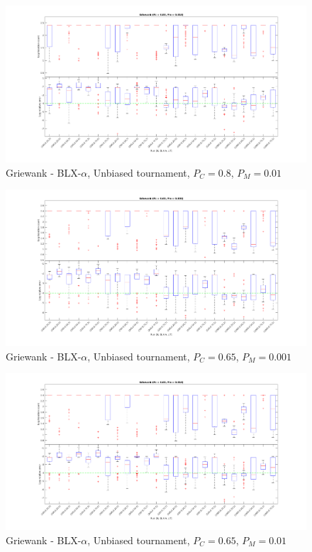 \documentclass[12pt, letterpaper]{article}
\begin{document}
\begin{figure}
  \includegraphics[width=\linewidth]{img/g_blx_ut_08_010.png}
  \centering
  \captionsetup{justification=centering}
  \caption{Griewank - BLX-$\alpha$, Unbiased tournament, $P_C = 0.8$, $P_M = 0.01$}
  \label{fig:g_blx_ut_08_010}
\end{figure}

\begin{figure}
  \includegraphics[width=\linewidth]{img/g_blx_ut_065_001.png}
  \centering
  \captionsetup{justification=centering}
  \caption{Griewank - BLX-$\alpha$, Unbiased tournament, $P_C = 0.65$, $P_M = 0.001$}
  \label{fig:g_blx_ut_065_001}
\end{figure}

\begin{figure}
  \includegraphics[width=\linewidth]{img/g_blx_ut_065_010.png}
  \centering
  \captionsetup{justification=centering}
  \caption{Griewank - BLX-$\alpha$, Unbiased tournament, $P_C = 0.65$, $P_M = 0.01$}
  \label{fig:g_blx_ut_065_010}
\end{figure}
\end{document}
